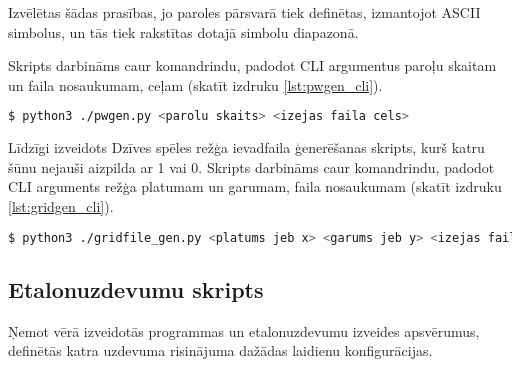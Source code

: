 Izvēlētas šādas prasības, jo paroles pārsvarā tiek definētas, izmantojot ASCII
simbolus, un tās  tiek rakstītas dotajā simbolu diapazonā.
\cite{pw_user_practice}

Skripts darbināms caur komandrindu, padodot CLI argumentus paroļu skaitam
un faila nosaukumam, ceļam (skatīt izdruku \ref{lst:pwgen_cli}).
\begin{lstlisting}[caption={Paroļu faila ģenerēšanas skripta darbināšana},
    label=lst:pwgen_cli, language=bash]
$ python3 ./pwgen.py <parolu skaits> <izejas faila cels>
\end{lstlisting}

Līdzīgi izveidots Dzīves spēles režģa ievadfaila ģenerēšanas skripts, kurš
katru šūnu nejauši aizpilda ar 1 vai 0. Skripts darbināms caur komandrindu,
padodot CLI arguments režģa platumam un garumam, faila nosaukumam (skatīt
izdruku \ref{lst:gridgen_cli}).

\begin{lstlisting}[caption={Režģa failaģenerēšanas skripta darbināšana},
    label=lst:gridgen_cli, language=bash]
$ python3 ./gridfile_gen.py <platums jeb x> <garums jeb y> <izejas faila cels>
\end{lstlisting}

\subsection{Etalonuzdevumu skripts}
Ņemot vērā izveidotās programmas un etalonuzdevumu izveides apsvērumus,
definētās katra uzdevuma risinājuma dažādas laidienu konfigurācijas.

